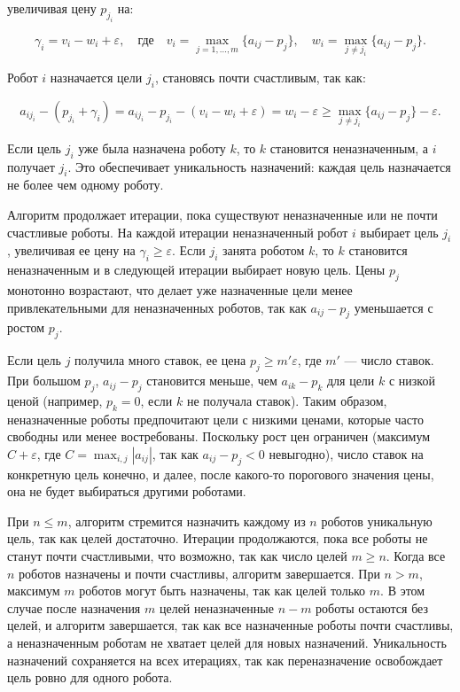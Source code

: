 увеличивая цену \( p_{j_i} \) на:

\[
\gamma_i = v_i - w_i + \varepsilon, \quad \text{где} \quad v_i = \max_{j=1,\ldots,m} \{a_{ij} - p_j\}, \quad w_i = \max_{j \neq j_i} \{a_{ij} - p_j\}.
\]

Робот \( i \) назначается цели \( j_i \), становясь почти счастливым, так как:

\[
a_{i j_i} - (p_{j_i} + \gamma_i) = a_{i j_i} - p_{j_i} - (v_i - w_i + \varepsilon) = w_i - \varepsilon \geq \max_{j \neq j_i} \{a_{ij} - p_j\} - \varepsilon.
\]

Если цель \( j_i \) уже была назначена роботу \( k \), то \( k \) становится неназначенным, а \( i \) получает \( j_i \). Это обеспечивает уникальность назначений: каждая цель назначается не более чем одному роботу.

Алгоритм продолжает итерации, пока существуют неназначенные или не почти счастливые роботы. На каждой итерации неназначенный робот \( i \) выбирает цель \( j_i \), увеличивая ее цену на \( \gamma_i \geq \varepsilon \). Если \( j_i \) занята роботом \( k \), то \( k \) становится неназначенным и в следующей итерации выбирает новую цель. Цены \( p_j \) монотонно возрастают, что делает уже назначенные цели менее привлекательными для неназначенных роботов, так как \( a_{ij} - p_j \) уменьшается с ростом \( p_j \).

Если цель \( j \) получила много ставок, ее цена \( p_j \geq m' \varepsilon \), где \( m' \) — число ставок. При большом \( p_j \), \( a_{ij} - p_j \) становится меньше, чем \( a_{ik} - p_k \) для цели \( k \) с низкой ценой (например, \( p_k = 0 \), если \( k \) не получала ставок). Таким образом, неназначенные роботы предпочитают цели с низкими ценами, которые часто свободны или менее востребованы. Поскольку рост цен ограничен (максимум \( C + \varepsilon \), где \( C = \max_{i,j} |a_{ij}| \), так как \( a_{ij} - p_j < 0 \) невыгодно), число ставок на конкретную цель конечно, и далее, после какого-то порогового значения цены, она не будет выбираться другими роботами.

При \( n \leq m \), алгоритм стремится назначить каждому из \( n \) роботов уникальную цель, так как целей достаточно. Итерации продолжаются, пока все роботы не станут почти счастливыми, что возможно, так как число целей \( m \geq n \). Когда все \( n \) роботов назначены и почти счастливы, алгоритм завершается. При \( n > m \), максимум \( m \) роботов могут быть назначены, так как целей только \( m \). В этом случае после назначения \( m \) целей неназначенные \( n - m \) роботы остаются без целей, и алгоритм завершается, так как все назначенные роботы почти счастливы, а неназначенным роботам не хватает целей для новых назначений. Уникальность назначений сохраняется на всех итерациях, так как переназначение освобождает цель ровно для одного робота.

